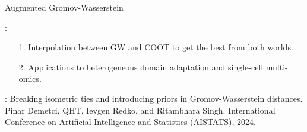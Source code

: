 \documentclass{beamer}
\begin{document}
\begin{frame}{Augmented Gromov-Wasserstein}
  \scriptsize


  \vspace{5cm}
  {}:
  \begin{enumerate}
    \setlength\itemindent{10pt}
    \item[1.] Interpolation between GW and COOT to get the best from both worlds.
    \item[2.] Applications to heterogeneous domain adaptation and single-cell multi-omics.
  \end{enumerate}

  \vspace{0.3cm}
  {}: Breaking isometric ties and introducing priors in Gromov-Wasserstein distances.
  Pinar Demetci, QHT, Ievgen Redko, and Ritambhara Singh.
  International Conference on Artificial Intelligence and Statistics (AISTATS), 2024.

\end{frame}
\end{document}
